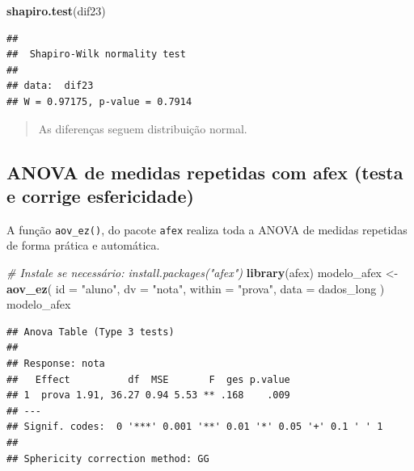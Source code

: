 \documentclass[
]{book}
\newenvironment{Shaded}{\begin{snugshade}}{\end{snugshade}}
\newcommand{\AttributeTok}[1]{\textcolor[rgb]{0.13,0.29,0.53}{#1}}
\newcommand{\CommentTok}[1]{\textcolor[rgb]{0.56,0.35,0.01}{\textit{#1}}}
\newcommand{\FunctionTok}[1]{\textcolor[rgb]{0.13,0.29,0.53}{\textbf{#1}}}
\newcommand{\NormalTok}[1]{#1}
\newcommand{\OtherTok}[1]{\textcolor[rgb]{0.56,0.35,0.01}{#1}}
\newcommand{\StringTok}[1]{\textcolor[rgb]{0.31,0.60,0.02}{#1}}
\begin{document}
\begin{Shaded}
\begin{Highlighting}[]
\FunctionTok{shapiro.test}\NormalTok{(dif23)}
\end{Highlighting}
\end{Shaded}

\begin{verbatim}
## 
##  Shapiro-Wilk normality test
## 
## data:  dif23
## W = 0.97175, p-value = 0.7914
\end{verbatim}

\begin{quote}
As diferenças seguem distribuição normal.
\end{quote}

\subsection{ANOVA de medidas repetidas com afex (testa e corrige esfericidade)}\label{anova-de-medidas-repetidas-com-afex-testa-e-corrige-esfericidade}

A função \texttt{aov\_ez()}, do pacote \texttt{afex} realiza toda a ANOVA de medidas repetidas de forma prática e automática.

\begin{Shaded}
\begin{Highlighting}[]
\CommentTok{\# Instale se necessário: install.packages("afex")}
\FunctionTok{library}\NormalTok{(afex)}
\NormalTok{modelo\_afex }\OtherTok{\textless{}{-}} \FunctionTok{aov\_ez}\NormalTok{(}
  \AttributeTok{id =} \StringTok{"aluno"}\NormalTok{,}
  \AttributeTok{dv =} \StringTok{"nota"}\NormalTok{,}
  \AttributeTok{within =} \StringTok{"prova"}\NormalTok{,}
  \AttributeTok{data =}\NormalTok{ dados\_long}
\NormalTok{)}
\NormalTok{modelo\_afex}
\end{Highlighting}
\end{Shaded}

\begin{verbatim}
## Anova Table (Type 3 tests)
## 
## Response: nota
##   Effect          df  MSE       F  ges p.value
## 1  prova 1.91, 36.27 0.94 5.53 ** .168    .009
## ---
## Signif. codes:  0 '***' 0.001 '**' 0.01 '*' 0.05 '+' 0.1 ' ' 1
## 
## Sphericity correction method: GG
\end{verbatim}
\end{document}
